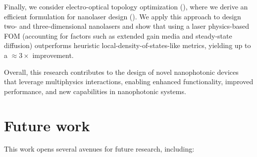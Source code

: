 Finally, we consider electro-optical topology optimization (), where we derive an efficient formulation for nanolaser design
(). We apply this approach to design two- and three-dimensional nanolasers and show that using
 a laser physics-based FOM (accounting for factors such as extended gain media and steady-state diffusion) outperforms
  heuristic local-density-of-states-like metrics, yielding up to a $\approx 3\times$ improvement.

Overall, this research contributes to the design of novel nanophotonic devices that leverage multiphysics interactions, enabling enhanced functionality, improved performance, and new capabilities in nanophotonic systems.

\section{Future work}

This work opens several avenues for future research, including:


